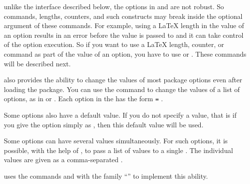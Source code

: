 %
unlike the interface described below, the options in  and
 are not robust. So commands, lengths, counters, and such
constructs may break inside the optional argument of these commands. For
example, using a \LaTeX{} length in the value of an option results in an error
before the value is passed to \KOMAScript{} and it can take control of the
option execution. So if you want to use a \LaTeX{} length, counter, or command
as part of the value of an option, you have to use
 or
. These commands will be described next.%
%
\EndIndexGroup


\begin{Declaration}
\end{Declaration}
\KOMAScript{} also
provides the ability to change the values of most
package options
even after loading the  package. You can use the  command to change the
values of a list of options, as in
 or
. Each option in the
 has the form \texttt{=}%
.

Some options also have a default value. If you do not specify a value, that is
if you give the option simply as , then this default value will
be used.

Some options can have several values simultaneously. For such options, it is
possible, with the help of , to pass a list of values to a
single . The individual values are given as a comma-separated
.

\begin{Explain}
  \KOMAScript{} uses the commands  and
   with the family ``'' to
  implement this ability.
\end{Explain}

